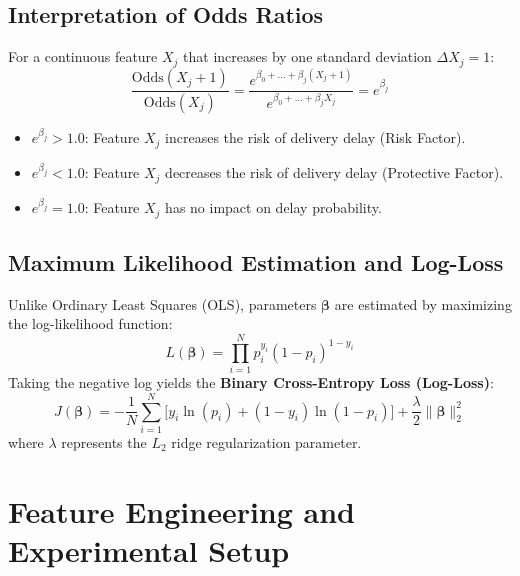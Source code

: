 \documentclass[11pt,a4paper]{article}
\begin{document}
\subsection{Interpretation of Odds Ratios}
For a continuous feature $X_j$ that increases by one standard deviation $\Delta X_j = 1$:
\begin{equation}
    \frac{\text{Odds}(X_j + 1)}{\text{Odds}(X_j)} = \frac{e^{\beta_0 + \dots + \beta_j(X_j + 1)}}{e^{\beta_0 + \dots + \beta_j X_j}} = e^{\beta_j}
\end{equation}
\begin{itemize}
    \item $e^{\beta_j} > 1.0$: Feature $X_j$ increases the risk of delivery delay (Risk Factor).
    \item $e^{\beta_j} < 1.0$: Feature $X_j$ decreases the risk of delivery delay (Protective Factor).
    \item $e^{\beta_j} = 1.0$: Feature $X_j$ has no impact on delay probability.
\end{itemize}

\subsection{Maximum Likelihood Estimation and Log-Loss}
Unlike Ordinary Least Squares (OLS), parameters $\boldsymbol{\beta}$ are estimated by maximizing the log-likelihood function:
\begin{equation}
    L(\boldsymbol{\beta}) = \prod_{i=1}^N p_i^{y_i} (1 - p_i)^{1 - y_i}
\end{equation}
Taking the negative log yields the \textbf{Binary Cross-Entropy Loss (Log-Loss)}:
\begin{equation}
    J(\boldsymbol{\beta}) = -\frac{1}{N} \sum_{i=1}^N \Big[ y_i \ln(p_i) + (1 - y_i) \ln(1 - p_i) \Big] + \frac{\lambda}{2} \|\boldsymbol{\beta}\|_2^2
    \label{eq:logloss}
\end{equation}
where $\lambda$ represents the $L_2$ ridge regularization parameter.

\section{Feature Engineering and Experimental Setup}
\label{sec:experiments}
\end{document}
